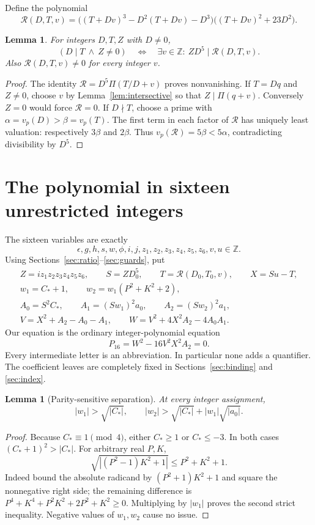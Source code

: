 \documentclass[11pt]{article}
\newtheorem{lemma}[theorem]{Lemma}
\theoremstyle{remark}\newtheorem{remark}[theorem]{Remark}
\newcommand{\Z}{\mathbb Z}\newcommand{\N}{\mathbb N}
\begin{document}
Define the polynomial
\[
 \mathcal R(D,T,v)=
 \bigl((T+Dv)^3-D^2(T+Dv)-D^3\bigr)
 \bigl((T+Dv)^2+23D^2\bigr).
\]
\begin{lemma}\label{lem:merge}
For integers $D,T,Z$ with $D\ne0$,
\[
 (D\mid T\ \wedge\ Z\ne0)
 \quad\Longleftrightarrow\quad
 \exists v\in\Z:\ ZD^5\mid\mathcal R(D,T,v).
\]
Also $\mathcal R(D,T,v)\ne0$ for every integer $v$.
\end{lemma}
\begin{proof}
The identity $\mathcal R=D^5\Pi(T/D+v)$ proves nonvanishing.
If $T=Dq$ and $Z\ne0$, choose $v$ by
Lemma~\ref{lem:intersective} so that $Z\mid\Pi(q+v)$.
Conversely $Z=0$ would force $\mathcal R=0$. If $D\nmid T$, choose
a prime with $\alpha=v_p(D)>\beta=v_p(T)$. The first term in each
factor of $\mathcal R$ has uniquely least valuation: respectively
$3\beta$ and $2\beta$. Thus $v_p(\mathcal R)=5\beta<5\alpha$,
contradicting divisibility by $D^5$.
\end{proof}

\section{The polynomial in sixteen unrestricted integers}\label{sec:main}
The sixteen variables are exactly
\[
 \epsilon,g,h,s,w,\phi,i,j,z_1,z_2,z_3,z_4,z_5,z_6,v,u\in\Z.
\]
Using Sections~\ref{sec:ratio}--\ref{sec:guards}, put
\begin{gather*}
 Z=i z_1z_2z_3z_4z_5z_6,\qquad S=ZD_0^5,\qquad
 T=\mathcal R(D_0,T_0,v),\qquad X=Su-T,\\
 w_1=C_*+1,\qquad w_2=w_1(P^2+K^2+2),\\
 A_0=S^2C_*,\qquad A_1=(Sw_1)^2a_0,\qquad A_2=(Sw_2)^2a_1,\\
 V=X^2+A_2-A_0-A_1,\qquad
 W=V^2+4X^2A_2-4A_0A_1.
\end{gather*}
Our equation is the ordinary integer-polynomial equation
\begin{equation}
 \boxed{\ P_{16}=W^2-16V^2X^2A_2=0.\ }\label{eq:p16}
\end{equation}
Every intermediate letter is an abbreviation. In particular none adds a
quantifier. The coefficient leaves are completely fixed in
Sections~\ref{sec:binding} and \ref{sec:index}.

\begin{lemma}[Parity-sensitive separation]\label{lem:weights}
At every integer assignment,
\[
 |w_1|>\sqrt{|C_*|},\qquad
 |w_2|>\sqrt{|C_*|}+|w_1|\sqrt{|a_0|}.
\]
\end{lemma}
\begin{proof}
Because $C_*\equiv1\pmod4$, either $C_*\ge1$ or $C_*\le-3$.
In both cases $(C_*+1)^2>|C_*|$. For arbitrary real $P,K$,
\[
 \sqrt{|(P^2-1)K^2+1|}\le P^2+K^2+1.
\]
Indeed bound the absolute radicand by $(P^2+1)K^2+1$ and square the
nonnegative right side; the remaining difference is
$P^4+K^4+P^2K^2+2P^2+K^2\ge0$. Multiplying by $|w_1|$ proves
the second strict inequality. Negative values of $w_1,w_2$ cause no issue.
\end{proof}
\end{document}
